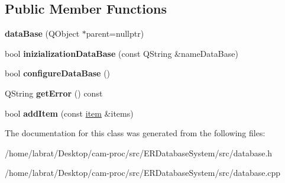 \subsection*{Public Member Functions}
\begin{DoxyCompactItemize}
\item 
{\bfseries data\+Base} (Q\+Object $\ast$parent=nullptr)\hypertarget{classdataBase_a53197521a30c3075260da045b7575f93}{}\label{classdataBase_a53197521a30c3075260da045b7575f93}

\item 
bool {\bfseries inizialization\+Data\+Base} (const Q\+String \&name\+Data\+Base)\hypertarget{classdataBase_a8f005ba00f5a3545baba1e304639bfbf}{}\label{classdataBase_a8f005ba00f5a3545baba1e304639bfbf}

\item 
bool {\bfseries configure\+Data\+Base} ()\hypertarget{classdataBase_ab1570d0f909bbb94288e87f1c9888929}{}\label{classdataBase_ab1570d0f909bbb94288e87f1c9888929}

\item 
Q\+String {\bfseries get\+Error} () const \hypertarget{classdataBase_a4c4bb9533d9f659d2fdc2d53f77b8ea0}{}\label{classdataBase_a4c4bb9533d9f659d2fdc2d53f77b8ea0}

\item 
bool {\bfseries add\+Item} (const \hyperlink{classitem}{item} \&items)\hypertarget{classdataBase_ab6e108898b0d9ddf48922457432e8b41}{}\label{classdataBase_ab6e108898b0d9ddf48922457432e8b41}

\end{DoxyCompactItemize}


The documentation for this class was generated from the following files\+:\begin{DoxyCompactItemize}
\item 
/home/labrat/\+Desktop/cam-\/proc/src/\+E\+R\+Database\+System/src/database.\+h\item 
/home/labrat/\+Desktop/cam-\/proc/src/\+E\+R\+Database\+System/src/database.\+cpp\end{DoxyCompactItemize}
